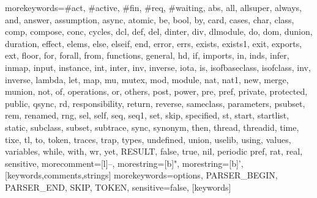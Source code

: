   {morekeywords={\#act, \#active, \#fin, \#req, \#waiting, abs, all, allsuper, always, and, answer, 
     assumption, async, atomic, be, bool, by, card, cases, char, class, comp, compose, conc, cycles,
     dcl, def, del, dinter, div, dlmodule, do, dom, dunion, duration, effect, elems, else, elseif, end,
     error, errs, exists, exists1, exit, exports, ext, floor, for, forall, from, functions, 
     general, hd, if, imports, in, inds, infer, inmap, input, instance, int, inter, inv, inverse, iota, is, 
     isofbaseclass, isofclass, inv, inverse, lambda, let, map, mu,
     mutex, mod, module, nat, nat1, new, merge, 
     munion, not, of, operations, or, others, post, power, pre, pref, 
     private, protected, public, qsync, rd, responsibility, return, reverse,  
     sameclass, parameters, psubset, rem, renamed, rng, sel, self, seq, seq1, set, skip, specified, st, 
     start, startlist, static, subclass, subset, subtrace, sync, synonym, then, thread, 
     threadid, time, tixe, tl, to, token, traces, trap, types, undefined,
     union, uselib, using, values, 
     variables, while, with, wr, yet, RESULT, false, true, nil, periodic pref, rat, real},
   sensitive,
   morecomment=[l]--,
   morestring=[b]",
   morestring=[b]',
  }[keywords,comments,strings]
  {morekeywords={options, PARSER\_BEGIN, PARSER\_END, SKIP, TOKEN},
   sensitive=false,
  }[keywords]
